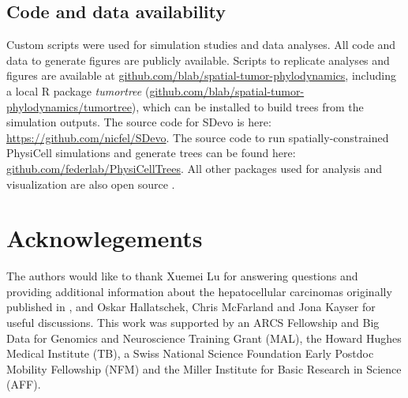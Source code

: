 \documentclass[12pt]{elife_based}
\begin{document}
\subsection*{Code and data availability}
Custom scripts were used for simulation studies and data analyses. All code and data to generate figures are publicly available. Scripts to replicate analyses and figures are available at \href{https://github.com/blab/spatial-tumor-phylodynamics}{github.com/blab/spatial-tumor-phylodynamics}, including a local R package \textit{tumortree} (\href{https://github.com/blab/spatial-tumor-phylodynamics/tumortree}{github.com/blab/spatial-tumor-phylodynamics/tumortree}), which can be installed to build trees from the simulation outputs. The source code for SDevo is here: \href{https://github.com/nicfel/SDevo}{https://github.com/nicfel/SDevo}. The source code to run spatially-constrained PhysiCell simulations and generate trees can be found here: \href{https://github.com/federlab/PhysiCellTrees}{github.com/federlab/PhysiCellTrees}. All other packages used for analysis and visualization are also open source \citep{Yu2017ggtree,Wang2019treeio}.  %

\section*{Acknowlegements}
The authors would like to thank Xuemei Lu for answering questions and providing additional information about the hepatocellular carcinomas originally published in \cite{Li2022}, and Oskar Hallatschek, Chris McFarland and Jona Kayser for useful discussions. This work was supported by an ARCS Fellowship and Big Data for Genomics and Neuroscience Training Grant (MAL), the Howard Hughes Medical Institute (TB), a Swiss National Science Foundation Early Postdoc Mobility Fellowship (NFM) and the Miller Institute for Basic Research in Science (AFF). 





\pagebreak


\setcounter{figure}{0}

\makeatletter 
\renewcommand{\thefigure}{S\@arabic\c@figure}
\makeatother
\end{document}
